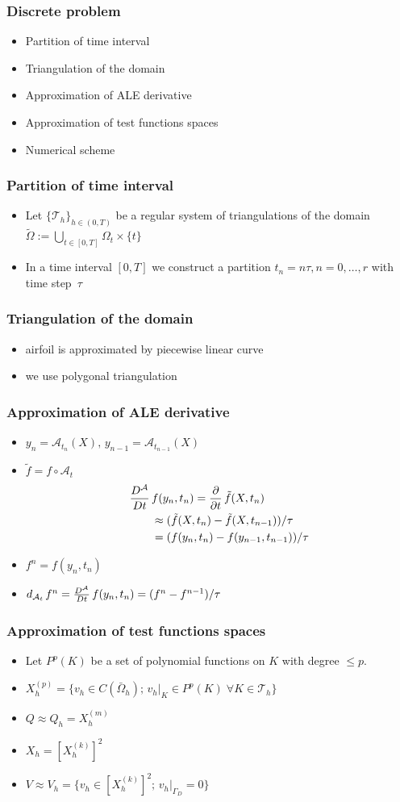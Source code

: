 \documentclass{beamer}
\begin{document}
\frame
{
	\frametitle{Discrete problem}
	\begin{itemize}
		\item Partition of time interval 
      	\item Triangulation of the domain
      	\item Approximation of ALE derivative
      	\item Approximation of test functions spaces
      	\item Numerical scheme
	\end{itemize}
}

\frame
{
	\frametitle{Partition of time interval}
	\begin{itemize}
		\item Let $\{\mathcal T_h\}_{h \in (0,T)}$ be a regular system of triangulations of
		the domain $\widetilde\Omega:=\bigcup_{t\in[0,T]}\Omega_t\times\{t\}$
      	\item In a time interval $[0,T]$ we construct a partition $t_n=n\tau,
      	n=0,\ldots,r$ with time step~$\tau$
	\end{itemize}
}

\frame
{
	\frametitle{Triangulation of the domain}
	\begin{itemize}
		\item airfoil is approximated by piecewise linear curve 
		\item we use polygonal triangulation
	\end{itemize}
}

\frame
{
	\frametitle{Approximation of ALE derivative}
	\begin{itemize}
		\item $y_n=\mathcal A_{t_n}(X),\,y_{n-1}=\mathcal A_{t_{n-1}}(X)$
		\item $\tilde f=f\circ\mathcal A_t$
		\pause
      	\[
		\begin{split}
		\frac{D^\mathcal A}{Dt}\, &f(y_n,t_n) = \frac{\partial}{\partial t}\,\tilde{f}(X,t_n) \\
		&\approx(\tilde{f}(X,t_n)-\tilde{f}(X,t_{n-1}))/\tau \\
		&= (f(y_n,t_n)-f(y_{n-1},t_{n-1}))/\tau
		\end{split}
		\] 
		\pause
		\item $f^n=f(y_n,t_n)$
		\pause
		\item $d_{\mathcal A_t\,} f^n=\frac{D^\mathcal A}{Dt}\, f(y_n,t_n)=(f^n-f^{n-1})/\tau$
	\end{itemize}
}

\frame
{
	\frametitle{Approximation of test functions spaces}
	\begin{itemize}
      	\item Let $P^p(K)$ be a set of polynomial functions on $K$ with degree $\leq p$. 
      	\pause 
      	\item $X_h^{(p)}=\{v_h\in C(\bar{\Omega}_h);\, v_h|_K \in P^p(K)\;\forall K\in \mathcal T_h \}$
      	\pause 
      	\item $Q \approx Q_h=X_h^{(m)}$ 
      	\pause 
      	\item $X_h=[X_h^{(k)}]^2$
      	\pause 
      	\item $V \approx V_h=\{v_h \in [X_h^{(k)}]^2;\,v_h|_{\Gamma_D}=0\}$
	\end{itemize}
}
\end{document}
